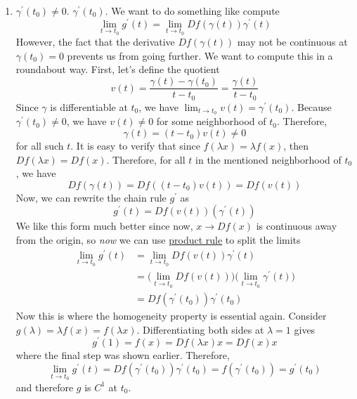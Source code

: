 \begin{solution}
\begin{enumerate}
\begin{enumerate}
					\item $\gamma^\prime (t_0) \neq 0$. $\gamma^\prime (t_0)$. We want to do something like compute 
						\begin{equation}
							\lim_{t \to t_0} g^\prime (t) = \lim_{t \to t_0} Df(\gamma(t)) \gamma^\prime (t)
						\end{equation} 
						However, the fact that the derivative $Df(\gamma(t))$ may not be continuous at $\gamma(t_0) = 0$ prevents us from going further. We want to compute this in a roundabout way. First, let's define the quotient 
						\begin{equation}
							v(t) = \frac{\gamma(t) - \gamma(t_0)}{t - t_0} = \frac{\gamma(t)}{t - t_0}
						\end{equation}
						Since $\gamma$ is differentiable at $t_0$, we have $\lim_{t \to t_0} v(t) = \gamma^\prime (t_0)$. Because $\gamma^\prime (t_0) \neq 0$, we have $v(t) \neq 0$ for some neighborhood of $t_0$. Therefore, 
						\begin{equation}
						  \gamma(t) = (t - t_0) v(t) \neq 0
						\end{equation}
						for all such $t$. It is easy to verify that since $f(\lambda x) = \lambda f(x)$, then $Df(\lambda x) = Df(x)$. Therefore, for all $t$ in the mentioned neighborhood of $t_0$, we have 
						\begin{equation}
							Df(\gamma(t)) = Df((t - t_0) v(t)) = Df(v(t)) 
						\end{equation}
						Now, we can rewrite the chain rule $g^\prime$ as 
						\begin{equation}
							g^\prime (t) = Df(v(t)) (\gamma^\prime (t))
						\end{equation}
						We like this form much better since now, $x \to Df(x)$ is continuous away from the origin, so \textit{now} we can use \hyperref[thm:product-rule]{product rule} to split the limits
						\begin{align}
							\lim_{t \to t_0} g^\prime (t) & = \lim_{t \to t_0} Df(v(t)) \gamma^\prime (t) \\ 
																						& = \big( \lim_{t \to t_0} Df(v(t)) \big) \big( \lim_{t \to t_0} \gamma^\prime (t) \big)\\ 
																						& = Df(\gamma^\prime (t_0)) \gamma^\prime (t_0) 
						\end{align}
						Now this is where the homogeneity property is essential again. Consider $g(\lambda) = \lambda f(x) = f(\lambda x)$. Differentiating both sides at $\lambda = 1$ gives 
						\begin{equation}
							g^\prime (1) = f(x) = Df(\lambda x) x = D f(x) x
						\end{equation} 
						where the final step was shown earlier. Therefore, 
						\begin{equation}
							\lim_{t \to t_0} g^\prime (t) = Df(\gamma^\prime (t_0)) \gamma^\prime (t_0) = f(\gamma^\prime (t_0)) = g^\prime (t_0)
						\end{equation}
						and therefore $g$ is $C^1$ at $t_0$. 
				\end{enumerate}


\end{enumerate}
\end{solution}
